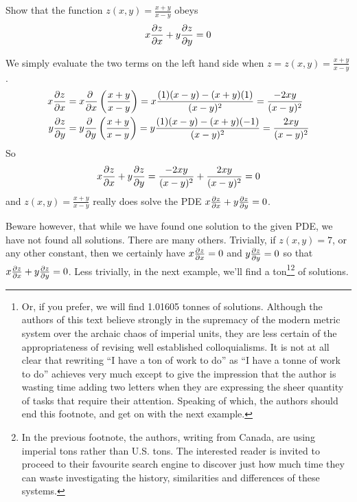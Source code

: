 \begin{eg}[$x\pdiff{z}{x}+ y\pdiff{z}{y}=0$]\label{eg_check_PDF_A}
Show that the function $z(x,y)=\frac{x+y}{x-y}$ obeys
\begin{equation*}
x\pdiff{z}{x}+ y\pdiff{z}{y}=0
\end{equation*}

\soln We simply evaluate the two terms on the left hand side when 
$z=z(x,y)=\frac{x+y}{x-y}$.
\begin{align*}
x\pdiff{z}{x}&= x\pdiff{}{x}\left(\frac{x+y}{x-y}\right)
=x\frac{(1)(x-y)-(x+y)(1)}{(x-y)^2}
=\frac{-2xy}{(x-y)^2} 
\\
y\pdiff{z}{y}&= y\pdiff{}{y}\left(\frac{x+y}{x-y}\right)
=y\frac{(1)(x-y)-(x+y)(-1)}{(x-y)^2}
=\frac{2xy}{(x-y)^2}
\end{align*}
So
\begin{equation*}
x\pdiff{z}{x}+y\pdiff{z}{y}
=\frac{-2xy}{(x-y)^2} +\frac{2xy}{(x-y)^2}
=0
\end{equation*}
and 
$z(x,y)=\frac{x+y}{x-y}$ really does solve the PDE
$
x\pdiff{z}{x}+ y\pdiff{z}{y}=0
$.

Beware however, that while we have found one solution to the given PDE, we have not found all solutions. There are many others. Trivially, if $z(x,y)=7$, or any other constant, then we certainly have  $x\pdiff{z}{x}=0$ and $y\pdiff{z}{y}=0$
so that $x\pdiff{z}{x}+ y\pdiff{z}{y}=0$. Less trivially, in the next example,
we'll find a ton\footnote{Or, if you prefer, we will find 1.01605 
tonnes of solutions. Although the authors of this text believe strongly in the supremacy of the modern metric system over the archaic chaos of imperial units, they are less certain of the appropriateness of revising well established colloquialisms. It is not at all clear that rewriting ``I have a ton of work to do'' as ``I have a tonne of work to do'' achieves very much except to give the impression that the author is wasting time adding two letters when they are expressing the sheer quantity of tasks that require their attention. Speaking of which, the authors should end this footnote, and get on with the next 
example.}\footnote{In the previous footnote, the authors, writing from Canada, are using imperial tons rather than U.S. tons. The interested reader is invited to proceed to their favourite search engine to discover just how much time they can waste investigating the history, similarities and differences of these systems.} of solutions.
\end{eg}


